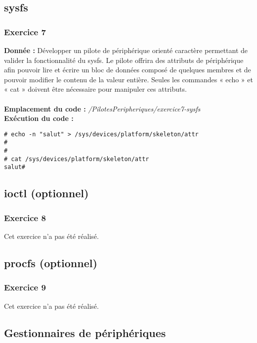 \subsection{sysfs}
\subsubsection{Exercice 7}
\textbf{Donnée : } Développer	un	pilote	de	périphérique	orienté	caractère	permettant	de	valider	la	fonctionnalité	du	
sysfs.	Le	pilote		offrira	des	attributs	de	périphérique	afin	pouvoir	lire	et	écrire	un	bloc	de	données	
composé	de	quelques	membres	et	de	pouvoir	modifier	le	contenu	de	la	valeur	entière.	Seules	les	
commandes	« echo » et	« cat » doivent	être	nécessaire	pour	manipuler	ces	attributs.\\\\

\textbf{Emplacement du code : } \textit{/PilotesPeripheriques/exercice7-sysfs}\\


\textbf{Exécution du code : } \\
\begin{lstlisting}
# echo -n "salut" > /sys/devices/platform/skeleton/attr 
# 
# 
# cat /sys/devices/platform/skeleton/attr 
salut# 
\end{lstlisting}

\subsection{ioctl (optionnel)}
\subsubsection{Exercice 8}
Cet exercice n'a pas été réalisé.

\subsection{procfs (optionnel)}
\subsubsection{Exercice 9}
Cet exercice n'a pas été réalisé.

\subsection{Gestionnaires de périphériques}
